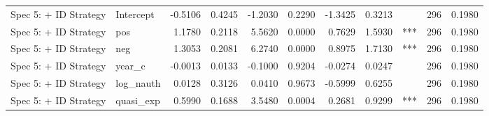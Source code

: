 \begin{tabular}{llrrrrrrlrr}
Spec 5: + ID Strategy & Intercept & -0.5106 & 0.4245 & -1.2030 & 0.2290 & -1.3425 & 0.3213 &  & 296 & 0.1980 \\
Spec 5: + ID Strategy & pos & 1.1780 & 0.2118 & 5.5620 & 0.0000 & 0.7629 & 1.5930 & *** & 296 & 0.1980 \\
Spec 5: + ID Strategy & neg & 1.3053 & 0.2081 & 6.2740 & 0.0000 & 0.8975 & 1.7130 & *** & 296 & 0.1980 \\
Spec 5: + ID Strategy & year_c & -0.0013 & 0.0133 & -0.1000 & 0.9204 & -0.0274 & 0.0247 &  & 296 & 0.1980 \\
Spec 5: + ID Strategy & log_nauth & 0.0128 & 0.3126 & 0.0410 & 0.9673 & -0.5999 & 0.6255 &  & 296 & 0.1980 \\
Spec 5: + ID Strategy & quasi_exp & 0.5990 & 0.1688 & 3.5480 & 0.0004 & 0.2681 & 0.9299 & *** & 296 & 0.1980 \\
\bottomrule
\end{tabular}

